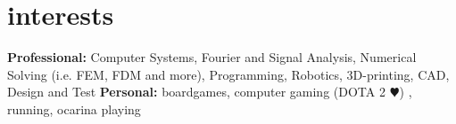 \documentclass[]{friggeri-cv} %
\begin{document}





\newpage
\section{interests}

\textbf{Professional:} Computer Systems, Fourier and Signal Analysis, Numerical Solving (i.e. FEM, FDM and more), Programming, Robotics, 3D-printing, CAD, Design and Test \textbf{Personal:} boardgames, computer gaming (DOTA 2{\color{red} $\varheartsuit$}) , running, ocarina playing  


\end{document}
